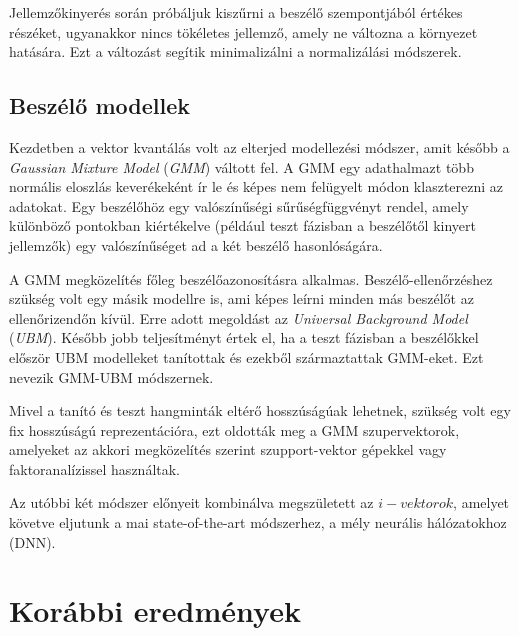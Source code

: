 Jellemzőkinyerés során próbáljuk kiszűrni a beszélő szempontjából értékes részéket, ugyanakkor nincs tökéletes jellemző, amely ne változna a környezet hatására. Ezt a változást segítik minimalizálni a normalizálási módszerek.

\subsection{Beszélő modellek}

Kezdetben a vektor kvantálás volt az elterjed modellezési módszer, amit később a \emph{Gaussian Mixture Model} (\emph{GMM}) váltott fel. A GMM egy adathalmazt több normális eloszlás keverékeként ír le és képes nem felügyelt módon klaszterezni az adatokat. Egy beszélőhöz egy valószínűségi sűrűségfüggvényt rendel, amely különböző pontokban kiértékelve (például teszt fázisban a beszélőtől kinyert jellemzők) egy valószínűséget ad a két beszélő hasonlóságára.

A GMM megközelítés főleg beszélőazonosításra alkalmas. Beszélő-ellenőrzéshez szükség volt egy másik modellre is, ami képes leírni minden más beszélőt az ellenőrizendőn kívül. Erre adott megoldást az \emph{Universal Background Model} (\emph{UBM}). Később jobb teljesítményt értek el, ha a teszt fázisban a beszélőkkel először UBM modelleket tanítottak és ezekből származtattak GMM-eket. Ezt nevezik GMM-UBM módszernek.

Mivel a tanító és teszt hangminták eltérő hosszúságúak lehetnek, szükség volt egy fix hosszúságú reprezentációra, ezt oldották meg a GMM szupervektorok, amelyeket az akkori megközelítés szerint szupport-vektor gépekkel vagy faktoranalízissel használtak.

Az utóbbi két módszer előnyeit kombinálva megszületett az $i-vektorok$, amelyet követve eljutunk a mai state-of-the-art módszerhez, a mély neurális hálózatokhoz (DNN).

\section{Korábbi eredmények}



